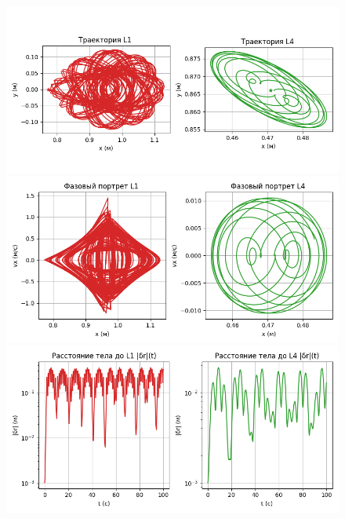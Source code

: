 \documentclass[12pt]{article}
\begin{document}
\begin{figure}[H]
  \centering
  \includegraphics[width=1\textwidth]{Figure_1.png}
  \includegraphics[width=1\textwidth]{Figure_2.png}
  \includegraphics[width=1\textwidth]{Figure_3.png}
\end{figure}
\end{document}
